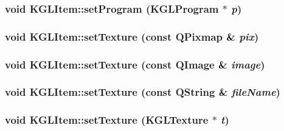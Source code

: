 \hypertarget{class_k_g_l_item_d615added4952e9d4e386ab8606872d6}{
\subsubsection[{setProgram}]{\setlength{\rightskip}{0pt plus 5cm}void KGLItem::setProgram ({\bf KGLProgram} $\ast$ {\em p})}}
\label{class_k_g_l_item_d615added4952e9d4e386ab8606872d6}


\hypertarget{class_k_g_l_item_3cf5a12787e3a1be3695a4a2460b9f0d}{
\subsubsection[{setTexture}]{\setlength{\rightskip}{0pt plus 5cm}void KGLItem::setTexture (const QPixmap \& {\em pix})}}
\label{class_k_g_l_item_3cf5a12787e3a1be3695a4a2460b9f0d}


\hypertarget{class_k_g_l_item_c68ff3db4cf505a10c1f95dbb24b3d8e}{
\subsubsection[{setTexture}]{\setlength{\rightskip}{0pt plus 5cm}void KGLItem::setTexture (const QImage \& {\em image})}}
\label{class_k_g_l_item_c68ff3db4cf505a10c1f95dbb24b3d8e}


\hypertarget{class_k_g_l_item_73e87ddc6624de761a908880ab63bd77}{
\subsubsection[{setTexture}]{\setlength{\rightskip}{0pt plus 5cm}void KGLItem::setTexture (const QString \& {\em fileName})}}
\label{class_k_g_l_item_73e87ddc6624de761a908880ab63bd77}


\hypertarget{class_k_g_l_item_bf848a33d55dd5f96cd2399abe79411c}{
\subsubsection[{setTexture}]{\setlength{\rightskip}{0pt plus 5cm}void KGLItem::setTexture ({\bf KGLTexture} $\ast$ {\em t})}}
\label{class_k_g_l_item_bf848a33d55dd5f96cd2399abe79411c}



